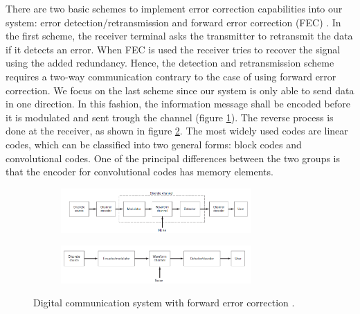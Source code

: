 \documentclass[12pt,a4paper,openright]{report}
\begin{document}
 There are two basic schemes to implement error correction capabilities into our system: error detection/retransmission and forward error correction (FEC) \cite{SklarBook}. In the first scheme, the receiver terminal asks the transmitter to retransmit the data if it detects an error. When FEC is used the receiver tries to recover the signal using the added redundancy. Hence, the detection and retransmission scheme requires a two-way communication contrary to the case of using forward error correction. We focus on the last scheme since our system is only able to send data in one direction. In this fashion, the information message shall be encoded before it is modulated and sent trough the channel (figure \ref{fig:ChanCodTX}). The reverse process is done at the receiver, as shown in figure \ref{fig:ChanCodRX}. The most widely used codes are linear codes, which can be classified into two general forms: block codes and convolutional codes. One of the principal differences between the two groups is that the encoder for convolutional codes has memory elements.
 
  \begin{figure}[H]
  \centering
 	\begin{subfigure}[H]{1\textwidth}
  \centering
     \includegraphics[width=0.8\textwidth]{chancodtx.PNG}
     \label{fig:ChanCodTX}
 
 	\end{subfigure}
 	\quad
 
 	\begin{subfigure}[H]{1\textwidth}
  	\centering
	     \includegraphics[width=0.8\textwidth]{chancodrx.PNG}
     \label{fig:ChanCodRX}
  	\end{subfigure}
     \caption[Digital communication system with forward error correction]{Digital communication system with forward error correction \cite{HaykinBook}.}
     \label{fig:ChanCoding}
 \end{figure}
 
\end{document}
